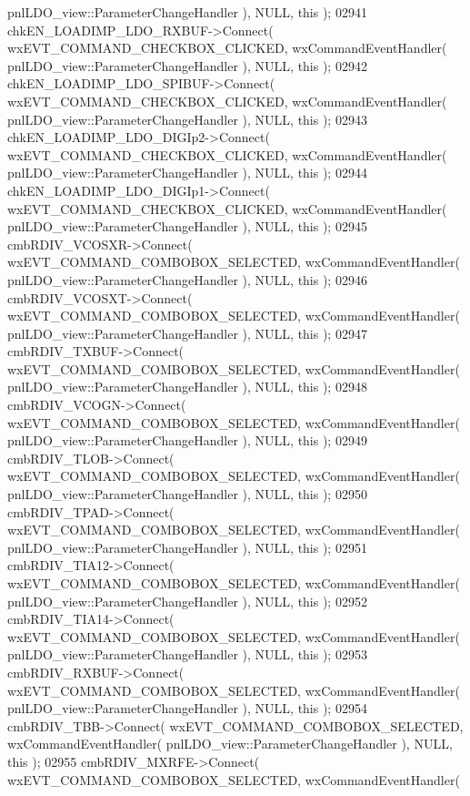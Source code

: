 \begin{DoxyCode}
      pnlLDO_view::ParameterChangeHandler ), NULL, \textcolor{keyword}{this} );
02941     chkEN_LOADIMP_LDO_RXBUF->Connect( wxEVT\_COMMAND\_CHECKBOX\_CLICKED, wxCommandEventHandler( 
      pnlLDO_view::ParameterChangeHandler ), NULL, \textcolor{keyword}{this} );
02942     chkEN_LOADIMP_LDO_SPIBUF->Connect( wxEVT\_COMMAND\_CHECKBOX\_CLICKED, wxCommandEventHandler( 
      pnlLDO_view::ParameterChangeHandler ), NULL, \textcolor{keyword}{this} );
02943     chkEN_LOADIMP_LDO_DIGIp2->Connect( wxEVT\_COMMAND\_CHECKBOX\_CLICKED, wxCommandEventHandler( 
      pnlLDO_view::ParameterChangeHandler ), NULL, \textcolor{keyword}{this} );
02944     chkEN_LOADIMP_LDO_DIGIp1->Connect( wxEVT\_COMMAND\_CHECKBOX\_CLICKED, wxCommandEventHandler( 
      pnlLDO_view::ParameterChangeHandler ), NULL, \textcolor{keyword}{this} );
02945     cmbRDIV_VCOSXR->Connect( wxEVT\_COMMAND\_COMBOBOX\_SELECTED, wxCommandEventHandler( 
      pnlLDO_view::ParameterChangeHandler ), NULL, \textcolor{keyword}{this} );
02946     cmbRDIV_VCOSXT->Connect( wxEVT\_COMMAND\_COMBOBOX\_SELECTED, wxCommandEventHandler( 
      pnlLDO_view::ParameterChangeHandler ), NULL, \textcolor{keyword}{this} );
02947     cmbRDIV_TXBUF->Connect( wxEVT\_COMMAND\_COMBOBOX\_SELECTED, wxCommandEventHandler( 
      pnlLDO_view::ParameterChangeHandler ), NULL, \textcolor{keyword}{this} );
02948     cmbRDIV_VCOGN->Connect( wxEVT\_COMMAND\_COMBOBOX\_SELECTED, wxCommandEventHandler( 
      pnlLDO_view::ParameterChangeHandler ), NULL, \textcolor{keyword}{this} );
02949     cmbRDIV_TLOB->Connect( wxEVT\_COMMAND\_COMBOBOX\_SELECTED, wxCommandEventHandler( 
      pnlLDO_view::ParameterChangeHandler ), NULL, \textcolor{keyword}{this} );
02950     cmbRDIV_TPAD->Connect( wxEVT\_COMMAND\_COMBOBOX\_SELECTED, wxCommandEventHandler( 
      pnlLDO_view::ParameterChangeHandler ), NULL, \textcolor{keyword}{this} );
02951     cmbRDIV_TIA12->Connect( wxEVT\_COMMAND\_COMBOBOX\_SELECTED, wxCommandEventHandler( 
      pnlLDO_view::ParameterChangeHandler ), NULL, \textcolor{keyword}{this} );
02952     cmbRDIV_TIA14->Connect( wxEVT\_COMMAND\_COMBOBOX\_SELECTED, wxCommandEventHandler( 
      pnlLDO_view::ParameterChangeHandler ), NULL, \textcolor{keyword}{this} );
02953     cmbRDIV_RXBUF->Connect( wxEVT\_COMMAND\_COMBOBOX\_SELECTED, wxCommandEventHandler( 
      pnlLDO_view::ParameterChangeHandler ), NULL, \textcolor{keyword}{this} );
02954     cmbRDIV_TBB->Connect( wxEVT\_COMMAND\_COMBOBOX\_SELECTED, wxCommandEventHandler( 
      pnlLDO_view::ParameterChangeHandler ), NULL, \textcolor{keyword}{this} );
02955     cmbRDIV_MXRFE->Connect( wxEVT\_COMMAND\_COMBOBOX\_SELECTED, wxCommandEventHandler( 

\end{DoxyCode}
